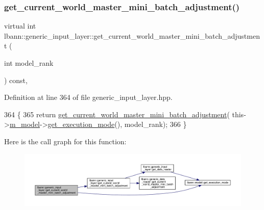 \subsubsection{\texorpdfstring{get\+\_\+current\+\_\+world\+\_\+master\+\_\+mini\+\_\+batch\+\_\+adjustment()}{get\_current\_world\_master\_mini\_batch\_adjustment()}\hspace{0.1cm}{\footnotesize\ttfamily [2/2]}}
{\footnotesize\ttfamily virtual int lbann\+::generic\+\_\+input\+\_\+layer\+::get\+\_\+current\+\_\+world\+\_\+master\+\_\+mini\+\_\+batch\+\_\+adjustment (\begin{DoxyParamCaption}\item[{int}]{model\+\_\+rank }\end{DoxyParamCaption}) const\hspace{0.3cm}{\ttfamily [inline]}, {\ttfamily [virtual]}}



Definition at line 364 of file generic\+\_\+input\+\_\+layer.\+hpp.


\begin{DoxyCode}
364                                                                                    \{
365     \textcolor{keywordflow}{return} \hyperlink{classlbann_1_1generic__input__layer_a8c3bf45beb91622d56f0dec89cba8e9a}{get\_current\_world\_master\_mini\_batch\_adjustment}(
      this->\hyperlink{classlbann_1_1Layer_a3d9315e99574166f2f33e37b572021d2}{m\_model}->\hyperlink{classlbann_1_1model_addb40597cf29aa6d31b6a7d09ef48608}{get\_execution\_mode}(), model\_rank);
366   \}
\end{DoxyCode}
Here is the call graph for this function\+:\nopagebreak
\begin{figure}[H]
\begin{center}
\leavevmode
\includegraphics[width=350pt]{classlbann_1_1generic__input__layer_a6c14ea2a50c7e7989e8e394671e4531a_cgraph}
\end{center}
\end{figure}
\mbox{\label{classlbann_1_1generic__input__layer_a6008b13521d27d6139201fa374b088eb}} 

